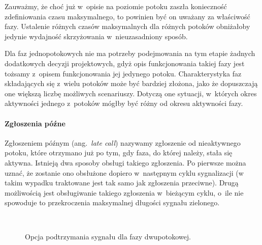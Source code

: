 \documentclass{pracamgr}
\newcommand{\ang}[1]{(ang.~\emph{#1})}
\theoremstyle{plain}
\begin{document}
Zauważmy, że choć już w~opisie na poziomie potoku zaszła konieczność
zdefiniowania czasu maksymalnego, to powinien być on uważany za
właściwość fazy. Ustalenie różnych czasów maksymalnych dla różnych
potoków obniżałoby jedynie wydajność skrzyżowania w~nieuzasadniony
sposób.

Dla faz jednopotokowych nie ma potrzeby podejmowania na tym etapie
żadnych dodatkowych decyzji projektowych, gdyż opis funkcjonowania
takiej fazy jest tożsamy z~opisem funkcjonowania jej jedynego
potoku. Charakterystyka faz składających się z~wielu potoków może być
bardziej złożona, jako że dopuszczają one większą liczbę możliwych
scenariuszy. Dotyczą one sytuacji, w~których okres aktywności jednego
z~potoków mógłby być różny od okresu aktywności fazy.

\paragraph{Zgłoszenia późne} Zgłoszeniem późnym \ang{late call} nazywamy zgłoszenie od
nieaktywnego potoku, które otrzymano już po tym, gdy faza, do której
należy, stała się aktywna. Istnieją dwa sposoby obsługi takiego
zgłoszenia. Po pierwsze można uznać, że zostanie ono obsłużone dopiero
w~następnym cyklu sygnalizacji (w takim wypadku traktowane jest tak
samo jak zgłoszenia przeciwne). Drugą możliwością jest obsługiwanie
takiego zgłoszenia w~bieżącym cyklu, o~ile nie spowoduje to
przekroczenia maksymalnej długości sygnału zielonego.
\begin{figure}
  \centering
  \\\vspace{0.5cm}
  \caption{Opcja podtrzymania sygnału dla fazy dwupotokowej.}
\end{figure}
\end{document}
